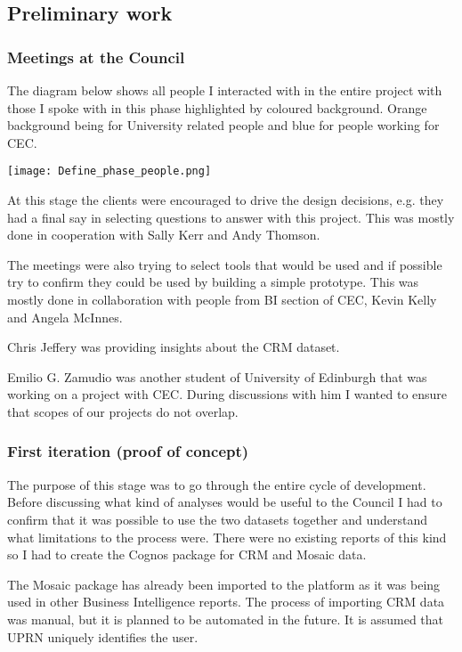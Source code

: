 		\subsection{Preliminary work}
		
			\subsubsection{Meetings at the Council}
			
The diagram below shows all people I interacted with in the entire project with those I spoke with in this phase highlighted by coloured background. Orange background being for University related people and blue for people working for CEC.


\begin{center}
  \texttt{[image: Define\_phase\_people.png]}
  \label{normal_case}
\end{center}


At this stage the clients were encouraged to drive the design decisions, e.g. they had a final say in selecting questions to answer with this project. This was mostly done in cooperation with Sally Kerr and Andy Thomson.

The meetings were also trying to select tools that would be used and if possible try to confirm they could be used by building a simple prototype. This was mostly done in collaboration with people from BI section of CEC, Kevin Kelly and Angela McInnes.

Chris Jeffery was providing insights about the CRM dataset.

Emilio G. Zamudio was another student of University of Edinburgh that was working on a project with CEC. During discussions with him I wanted to ensure that scopes of our projects do not overlap.
			\subsubsection{First iteration (proof of concept)}
			
The purpose of this stage was to go through the entire cycle of development. Before discussing what kind of analyses would be useful to the Council I had to confirm that it was possible to use the two datasets together and understand what limitations to the process were. There were no existing reports of this kind so I had to create the Cognos package for CRM and Mosaic data.

The Mosaic package has already been imported to the platform as it was being used in other Business Intelligence reports. The process of importing CRM data was manual, but it is planned to be automated in the future. It is assumed that UPRN uniquely identifies the user.

